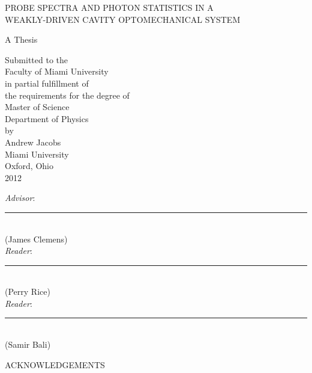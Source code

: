 \documentclass[12pt, oneside]{book}
\begin{document}
\begin{titlepage}
\begin{center}
PROBE SPECTRA AND PHOTON STATISTICS IN A \\ WEAKLY-DRIVEN CAVITY OPTOMECHANICAL SYSTEM

\vspace{1.5cm}

A Thesis \\

\vspace{0.5cm}

Submitted to the \\
Faculty of Miami University \\
in partial fulfillment of \\
the requirements for the degree of \\
Master of Science \\
Department of Physics \\
by \\
Andrew Jacobs \\
Miami University \\
Oxford, Ohio \\
2012

\vspace{1.5cm}

\emph{Advisor}: \rule[-0.1cm]{8cm}{0.01cm} \\
(James Clemens) \\
\vspace{1.5cm}
\emph{Reader}: \rule[-0.1cm]{8cm}{0.01cm} \\
(Perry Rice) \\
\vspace{1.5cm}
\emph{Reader}: \rule[-0.1cm]{8cm}{0.01cm} \\
(Samir Bali) \\
\end{center}
\end{titlepage}

\if@xetex
	\cleardoublepage
\else
	\ifpdf
		\cleardoublepage
	\else
		\cleardoublepage
	\fi
\fi

\setcounter{page}{2}
\tableofcontents
\setcounter{tocdepth}{2}
\listoffigures

\newpage

\begin{center} ACKNOWLEDGEMENTS \end{center}
\end{document}
